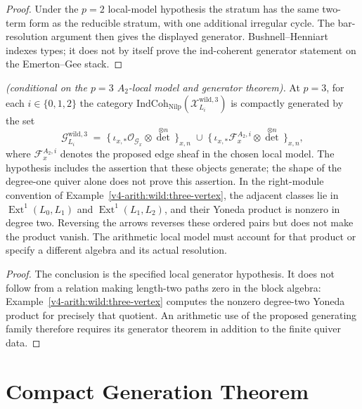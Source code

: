 \begin{proof}
Under the \(p=2\) local-model hypothesis the stratum has the same
two-term form as the reducible stratum, with one additional irregular
cycle. The bar-resolution argument then gives the displayed generator.
Bushnell--Henniart indexes types; it does not by itself prove the
ind-coherent generator statement on the Emerton--Gee stack.
\end{proof}

\begin{proposition}[compact generator on the wild strata at \(p=3\)]
\label{v4-arith:w5-g:f1a3-C:prop:compact-gen-wild-p3}
\ClaimStatusProvedHereConditional \emph{(conditional on the \(p=3\)
\(A_{2}\)-local model and generator theorem).} At \(p=3\), for each
\(i\in\{0,1,2\}\) the
category
\(\mathrm{IndCoh}_{\mathrm{Nilp}}(\mathcal{X}^{\mathrm{wild},3}_{L_{i}})\)
is compactly generated by the set
\[
\mathcal{G}^{\mathrm{wild},3}_{L_{i}}
\;=\;\bigl\{\,\iota_{x,*}\mathcal{O}_{\mathcal{G}_{x}}\otimes\det^{\otimes n}\,\bigr\}_{x,n}
\;\cup\;\bigl\{\,\iota_{x,*}\mathcal{F}^{A_{2},i}_{x}\otimes\det^{\otimes n}\,\bigr\}_{x,n},
\]
where \(\mathcal F^{A_2,i}_x\) denotes the proposed edge sheaf
in the chosen local model. The hypothesis includes the assertion that
these objects generate; the shape of the degree-one quiver alone
does not prove this assertion. In the right-module convention of
Example~\ref{v4-arith:wild:three-vertex}, the adjacent classes lie in
\(\operatorname{Ext}^1(L_0,L_1)\) and
\(\operatorname{Ext}^1(L_1,L_2)\), and their Yoneda product is nonzero
in degree two. Reversing the arrows reverses these ordered pairs
but does not make the product vanish. The arithmetic local model
must account for that product or specify a different algebra and
its actual resolution.
\end{proposition}
\begin{proof}
The conclusion is the specified local generator hypothesis. It does
not follow from a relation making length-two paths zero in the
block algebra: Example~\ref{v4-arith:wild:three-vertex} computes the
nonzero degree-two Yoneda product for precisely that quotient.
An arithmetic use of the proposed generating family therefore
requires its generator theorem in addition to the finite quiver data.
\end{proof}

\section{Compact Generation Theorem}
\label{v4-arith:w5-g:f1a3-C:compact-gen-theorem}

